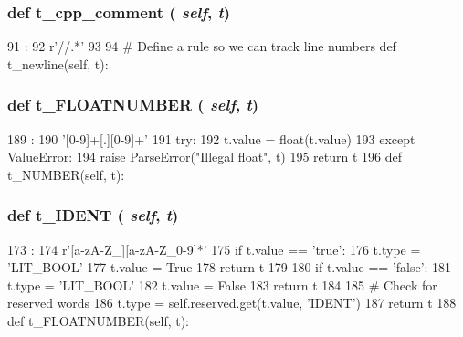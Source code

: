 \begin{DoxyVerb}
{\subsubsection[{t\_\-cpp\_\-comment}]{\setlength{\rightskip}{0pt plus 5cm}def t\_\-cpp\_\-comment ( {\em self}, \/   {\em t})}}
\label{classslicc_1_1parser_1_1SLICC_a30488dc841b93edf47146e784f2d61c7}



\begin{DoxyCode}
91                               :
92         r'//.*'
93 
94     # Define a rule so we can track line numbers
    def t_newline(self, t):
\end{DoxyCode}
\hypertarget{classslicc_1_1parser_1_1SLICC_aadb1a19aa82b065b5d230a3ad3932c5c}{
\subsubsection[{t\_\-FLOATNUMBER}]{\setlength{\rightskip}{0pt plus 5cm}def t\_\-FLOATNUMBER ( {\em self}, \/   {\em t})}}
\label{classslicc_1_1parser_1_1SLICC_aadb1a19aa82b065b5d230a3ad3932c5c}



\begin{DoxyCode}
189                               :
190         '[0-9]+[.][0-9]+'
191         try:
192             t.value = float(t.value)
193         except ValueError:
194             raise ParseError("Illegal float", t)
195         return t
196 
    def t_NUMBER(self, t):
\end{DoxyCode}
\hypertarget{classslicc_1_1parser_1_1SLICC_abe14fa96d0f17314cdd2d8d948dbdb0f}{
\subsubsection[{t\_\-IDENT}]{\setlength{\rightskip}{0pt plus 5cm}def t\_\-IDENT ( {\em self}, \/   {\em t})}}
\label{classslicc_1_1parser_1_1SLICC_abe14fa96d0f17314cdd2d8d948dbdb0f}



\begin{DoxyCode}
173                         :
174         r'[a-zA-Z_][a-zA-Z_0-9]*'
175         if t.value == 'true':
176             t.type = 'LIT_BOOL'
177             t.value = True
178             return t
179 
180         if t.value == 'false':
181             t.type = 'LIT_BOOL'
182             t.value = False
183             return t
184 
185         # Check for reserved words
186         t.type = self.reserved.get(t.value, 'IDENT')
187         return t
188 
    def t_FLOATNUMBER(self, t):
\end{DoxyCode}
\hypertarget{classslicc_1_1parser_1_1SLICC_a1b02371c148efc8eb5d363c18ce1a66e}{
}
\end{DoxyVerb}
